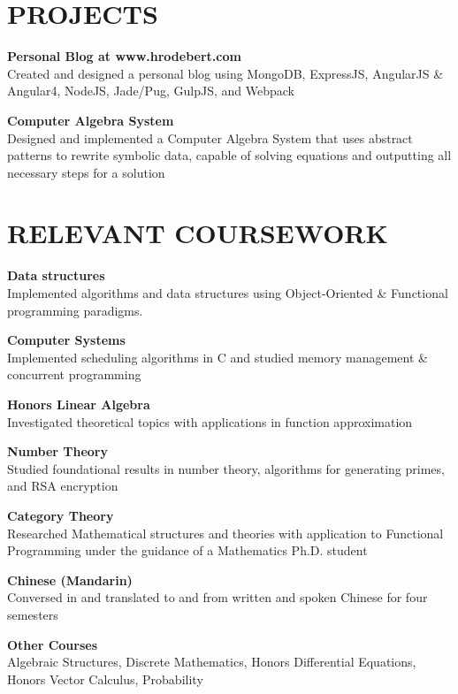 \documentclass[line,margin]{res}
\begin{document}
\begin{resume}
\section{PROJECTS}
    \begin{description}
        \item \textbf{Personal Blog at www.hrodebert.com} \hfill \\
            Created and designed a personal blog using MongoDB, ExpressJS, AngularJS \& Angular4, NodeJS, Jade/Pug, GulpJS, and Webpack
        \item \textbf{Computer Algebra System} \hfill \\
            Designed and implemented a Computer Algebra System that uses abstract \\
            patterns to rewrite symbolic data, capable of solving equations and outputting all necessary steps for a solution
    \end{description}

\section{RELEVANT COURSEWORK}
    \begin{description}
        \item \textbf{Data structures} \hfill \\
            Implemented algorithms and data structures using Object-Oriented \& Functional programming paradigms.
        \item \textbf{Computer Systems} \hfill \\
            Implemented scheduling algorithms in C and studied memory management \& concurrent programming
        \item \textbf{Honors Linear Algebra} \hfill \\
            Investigated theoretical topics with applications in function approximation
        \item \textbf{Number Theory} \hfill \\
            Studied foundational results in number theory, algorithms for generating primes, and RSA encryption
        \item \textbf{Category Theory} \hfill \\
            Researched Mathematical structures and theories with application to Functional Programming under the guidance of a Mathematics Ph.D. student
        \item \textbf{Chinese (Mandarin)} \hfill \\
            Conversed in and translated to and from written and spoken Chinese for four semesters
        \item \textbf{Other Courses} \hfill \\
            Algebraic Structures, Discrete Mathematics, Honors Differential Equations, \\
            Honors Vector Calculus, Probability
    \end{description}

\end{resume}
\end{document}
